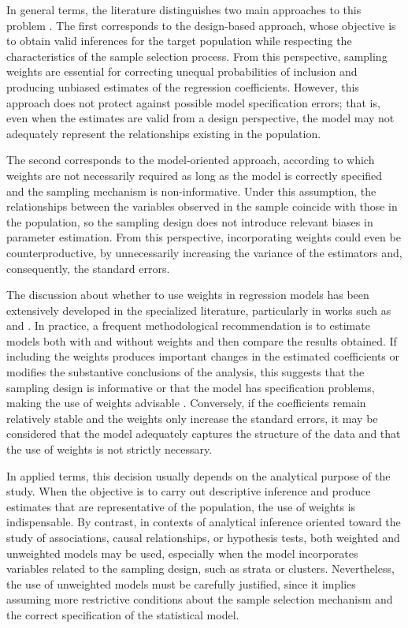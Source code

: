 \documentclass[
  english,
  12pt,
]{book}
\begin{document}
In general terms, the literature distinguishes two main approaches to this problem \citep{heeringa2017applied}. The first corresponds to the design-based approach, whose objective is to obtain valid inferences for the target population while respecting the characteristics of the sample selection process. From this perspective, sampling weights are essential for correcting unequal probabilities of inclusion and producing unbiased estimates of the regression coefficients. However, this approach does not protect against possible model specification errors; that is, even when the estimates are valid from a design perspective, the model may not adequately represent the relationships existing in the population.

The second corresponds to the model-oriented approach, according to which weights are not necessarily required as long as the model is correctly specified and the sampling mechanism is non-informative. Under this assumption, the relationships between the variables observed in the sample coincide with those in the population, so the sampling design does not introduce relevant biases in parameter estimation. From this perspective, incorporating weights could even be counterproductive, by unnecessarily increasing the variance of the estimators and, consequently, the standard errors.

The discussion about whether to use weights in regression models has been extensively developed in the specialized literature, particularly in works such as \citet{skinner1989analysis} and \citet{pfeffermann2011modelling}. In practice, a frequent methodological recommendation is to estimate models both with and without weights and then compare the results obtained. If including the weights produces important changes in the estimated coefficients or modifies the substantive conclusions of the analysis, this suggests that the sampling design is informative or that the model has specification problems, making the use of weights advisable \citep{UNhandbook}. Conversely, if the coefficients remain relatively stable and the weights only increase the standard errors, it may be considered that the model adequately captures the structure of the data and that the use of weights is not strictly necessary.

In applied terms, this decision usually depends on the analytical purpose of the study. When the objective is to carry out descriptive inference and produce estimates that are representative of the population, the use of weights is indispensable. By contrast, in contexts of analytical inference oriented toward the study of associations, causal relationships, or hypothesis tests, both weighted and unweighted models may be used, especially when the model incorporates variables related to the sampling design, such as strata or clusters. Nevertheless, the use of unweighted models must be carefully justified, since it implies assuming more restrictive conditions about the sample selection mechanism and the correct specification of the statistical model.
\end{document}
